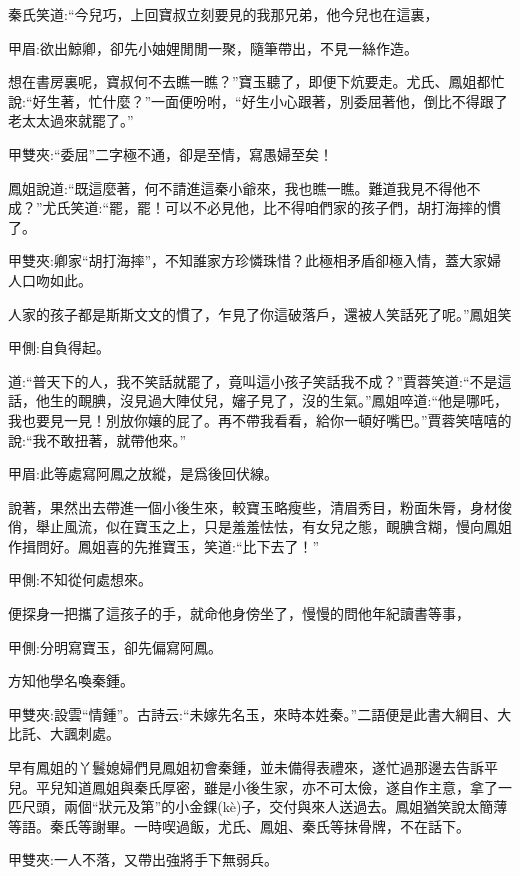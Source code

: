 \begin{parag}
    秦氏笑道:“今兒巧，上回寶叔立刻要見的我那兄弟，他今兒也在這裏，\begin{note}甲眉:欲出鯨卿，卻先小妯娌閒閒一聚，隨筆帶出，不見一絲作造。\end{note}想在書房裏呢，寶叔何不去瞧一瞧？”寶玉聽了，即便下炕要走。尤氏、鳳姐都忙說:“好生著，忙什麼？”一面便吩咐，“好生小心跟著，別委屈著他，倒比不得跟了老太太過來就罷了。”\begin{note}甲雙夾:“委屈”二字極不通，卻是至情，寫愚婦至矣！\end{note}鳳姐說道:“既這麼著，何不請進這秦小爺來，我也瞧一瞧。難道我見不得他不成？”尤氏笑道:“罷，罷！可以不必見他，比不得咱們家的孩子們，胡打海摔的慣了。\begin{note}甲雙夾:卿家“胡打海摔”，不知誰家方珍憐珠惜？此極相矛盾卻極入情，蓋大家婦人口吻如此。\end{note}人家的孩子都是斯斯文文的慣了，乍見了你這破落戶，還被人笑話死了呢。”鳳姐笑\begin{note}甲側:自負得起。\end{note}道:“普天下的人，我不笑話就罷了，竟叫這小孩子笑話我不成？”賈蓉笑道:“不是這話，他生的靦腆，沒見過大陣仗兒，嬸子見了，沒的生氣。”鳳姐啐道:“他是哪吒，我也要見一見！別放你孃的屁了。再不帶我看看，給你一頓好嘴巴。”賈蓉笑嘻嘻的說:“我不敢扭著，就帶他來。”\begin{note}甲眉:此等處寫阿鳳之放縱，是爲後回伏線。\end{note}
\end{parag}


\begin{parag}
    說著，果然出去帶進一個小後生來，較寶玉略瘦些，清眉秀目，粉面朱脣，身材俊俏，舉止風流，似在寶玉之上，只是羞羞怯怯，有女兒之態，靦腆含糊，慢向鳳姐作揖問好。鳳姐喜的先推寶玉，笑道:“比下去了！”\begin{note}甲側:不知從何處想來。\end{note}便探身一把攜了這孩子的手，就命他身傍坐了，慢慢的問他年紀讀書等事，\begin{note}甲側:分明寫寶玉，卻先偏寫阿鳳。\end{note}方知他學名喚秦鍾。\begin{note}甲雙夾:設雲“情鍾”。古詩云:“未嫁先名玉，來時本姓秦。”二語便是此書大綱目、大比託、大諷刺處。\end{note}早有鳳姐的丫鬟媳婦們見鳳姐初會秦鍾，並未備得表禮來，遂忙過那邊去告訴平兒。平兒知道鳳姐與秦氏厚密，雖是小後生家，亦不可太儉，遂自作主意，拿了一匹尺頭，兩個“狀元及第”的小金錁(kè)子，交付與來人送過去。鳳姐猶笑說太簡薄等語。秦氏等謝畢。一時喫過飯，尤氏、鳳姐、秦氏等抹骨牌，不在話下。\begin{note}甲雙夾:一人不落，又帶出強將手下無弱兵。\end{note}
\end{parag}


